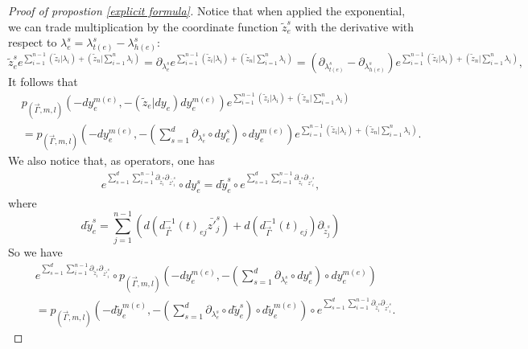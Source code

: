 \documentclass[11pt]{amsart}
\theoremstyle{definition}
\theoremstyle{remark}
\numberwithin{equation}{section}
\begin{document}
\begin{proof}[Proof of propostion \ref{explicit formula}]
    Notice that when applied the exponential, we can trade multiplication by the coordinate function $\tilde{z}^s_e$
    with the derivative with respect to $\lambda_e^s=\lambda_{t(e)}^s-\lambda_{h(e)}^s$:
    $$
    \tilde{z}^{s}_{e}e^{\sum\limits_{i=1}^{n-1}(\tilde{z}_{i}|\lambda_{i})+(\tilde{z}_{n}|\sum\limits_{i=1}^{n}\lambda_{i})}=\partial_{\lambda_{e}^{s}}e^{\sum\limits_{i=1}^{n-1}(\tilde{z}_{i}|\lambda_{i})+(\tilde{z}_{n}|\sum\limits_{i=1}^{n}\lambda_{i})}=(\partial_{\lambda_{t(e)}^s}-\partial_{\lambda_{h(e)}^s})e^{\sum\limits_{i=1}^{n-1}(\tilde{z}_{i}|\lambda_{i})+(\tilde{z}_{n}|\sum\limits_{i=1}^{n}\lambda_{i})},
    $$
    It follows that
    \begin{align*}
        &p_{(\vec{\Gamma},m,l)}(-dy_{e}^{m(e)},-(\tilde{z}_{e}| dy_{e})dy_{e}^{m(e)})e^{\sum\limits_{i=1}^{n-1}(\tilde{z}_{i}|\lambda_{i})+(\tilde{z}_{n}|\sum\limits_{i=1}^{n}\lambda_{i})}\\
        &=
        p_{(\vec{\Gamma},m,l)}(-dy_{e}^{m(e)},-(\sum_{s=1}^{d}\partial_{\lambda_{e}^{s}}\circ dy_{e}^{s})\circ dy_{e}^{m(e)})e^{\sum\limits_{i=1}^{n-1}(\tilde{z}_{i}|\lambda_{i})+(\tilde{z}_{n}|\sum\limits_{i=1}^{n}\lambda_{i})}.
    \end{align*}
    We also notice that, as operators, one has
    \begin{align*}
        e^{\sum\limits_{s=1}^{d}\sum\limits_{i=1}^{n-1}\partial_{\tilde{z}_{i}^{s}}\partial_{\bar{z'}_{i}^{s}}}\circ dy_{e}^{s}=d\tilde{y}_{e}^{s}\circ
        e^{\sum\limits_{s=1}^{d}\sum\limits_{i=1}^{n-1}\partial_{\tilde{z}_{i}^{s}}\partial_{\bar{z'}_{i}^{s}}},
    \end{align*}
    where
    $$
    d\tilde{y}_{e}^{s}=\sum_{j=1}^{n-1}\left(
        d\left(d^{-1}_{\vec{\Gamma}}(t)_{ej}\bar{z'}_{j}^{s}\right)+d\left(d^{-1}_{\vec{\Gamma}}(t)_{ej}\right)\partial_{\tilde{z}_{j}^{s}}
        \right)
    $$
    So we have
    \begin{align*}
        &e^{\sum\limits_{s=1}^{d}\sum\limits_{i=1}^{n-1}\partial_{\tilde{z}_{i}^{s}}\partial_{\bar{z'}_{i}^{s}}}\circ
        p_{(\vec{\Gamma},m,l)}(-dy_{e}^{m(e)},-(\sum\limits_{s=1}^{d}\partial_{\lambda_{e}^{s}}\circ dy_{e}^{s})\circ dy_{e}^{m(e)})\\
        &=
        p_{(\vec{\Gamma},m,l)}(-d\tilde{y}_{e}^{m(e)},-(\sum\limits_{s=1}^{d}\partial_{\lambda_{e}^{s}}\circ d\tilde{y}_{e}^{s})\circ d\tilde{y}_{e}^{m(e)})\circ
        e^{\sum\limits_{s=1}^{d}\sum\limits_{i=1}^{n-1}\partial_{\tilde{z}_{i}^{s}}\partial_{\bar{z'}_{i}^{s}}}.
    \end{align*}

\end{proof}
\end{document}
